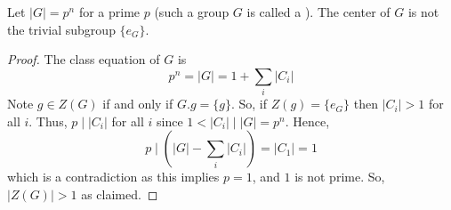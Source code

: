 \documentclass[12pt, a4paper, oneside, openright, titlepage]{book}
\begin{document}
\begin{prop}
        Let $|G| = p^n$ for a prime $p$ (such a group $G$ is called a ). The center of $G$ is not the trivial subgroup $\{e_G\}$.
\end{prop}
\begin{proof}
        The class equation of $G$ is \begin{equation}
                p^n = |G| = 1+\sum_i|C_i|
        \end{equation}
        Note $g \in Z(G)$ if and only if $G.g = \{g\}$. So, if $Z(g) = \{e_G\}$ then $|C_i| > 1$ for all $i$. Thus, $p\;\vert\;|C_i|$ for all $i$ since $1 < |C_i|\;\vert\;|G| = p^n$. Hence, \begin{equation}
                p\;\vert\;\left(|G|-\sum_i|C_i|\right) = |C_1| = 1
        \end{equation}
        which is a contradiction as this implies $p = 1$, and $1$ is not prime. So, $|Z(G)| > 1$ as claimed.
\end{proof}
\end{document}
